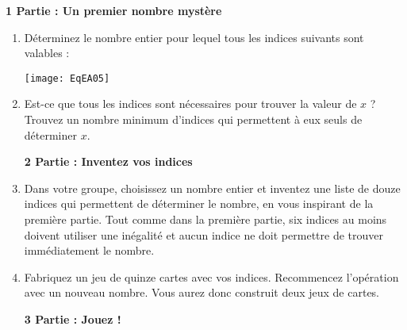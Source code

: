 \begin{TP}

\vspace{1em}\textbf{1 Partie : Un premier nombre mystère}\vspace{1em}

\begin{enumerate}
\item Déterminez le nombre entier pour lequel tous les indices suivants sont valables :

\begin{center}
    \texttt{[image: EqEA05]}
\end{center}


\item Est-ce que tous les indices sont nécessaires pour trouver la valeur de $x$ ? Trouvez un nombre minimum d'indices qui permettent à eux seuls de déterminer $x$.


\vspace{1em}\textbf{2 Partie : Inventez vos indices}\vspace{1em}



\item Dans votre groupe, choisissez un nombre entier et inventez une liste de douze indices qui permettent de déterminer le nombre, en vous inspirant de la première partie. Tout comme dans la première partie, six indices au moins doivent utiliser une inégalité et aucun indice ne doit permettre de trouver immédiatement le nombre.
\item Fabriquez un jeu de quinze cartes avec vos indices. Recommencez l'opération avec un nouveau nombre. Vous aurez donc construit deux jeux de cartes.

\vspace{1em}\textbf{3 Partie : Jouez !}\vspace{1em}


\end{enumerate}
\end{TP}
